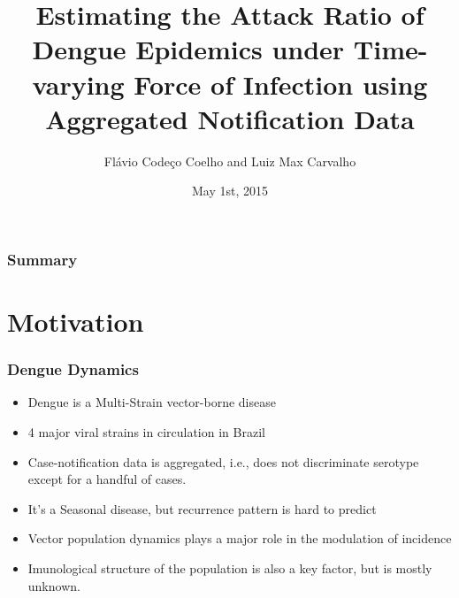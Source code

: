 \documentclass[10pt,compress,notheorems]{beamer}
\author{Flávio Codeço Coelho and Luiz Max Carvalho}
\title{Estimating the Attack Ratio of Dengue Epidemics under Time-varying 
Force of Infection using Aggregated Notification Data}
\date{May 1st, 2015}
\institute [EMAp, FGV]{Applied Mathematics School,   Fundação Getúlio Vargas}
\begin{document}
 \begin{frame}
\titlepage
\end{frame}

\begin{frame}[fragile]
\frametitle{Summary}
\tableofcontents
\end{frame}

\section{Motivation}
\begin{frame}
\frametitle{Dengue Dynamics}
\begin{itemize}[<+->]
  \item Dengue is a Multi-Strain  vector-borne disease
  \item 4 major viral strains in circulation in Brazil
  \item Case-notification data is aggregated, i.e., does not discriminate 
serotype except for a handful of cases.
  \item It's a Seasonal disease, but recurrence pattern is hard to predict
  \item Vector population dynamics plays a major role in the modulation of 
incidence
  \item Imunological structure of the population is also a key factor, but is 
mostly unknown.
\end{itemize}
\end{frame}
\end{document}
